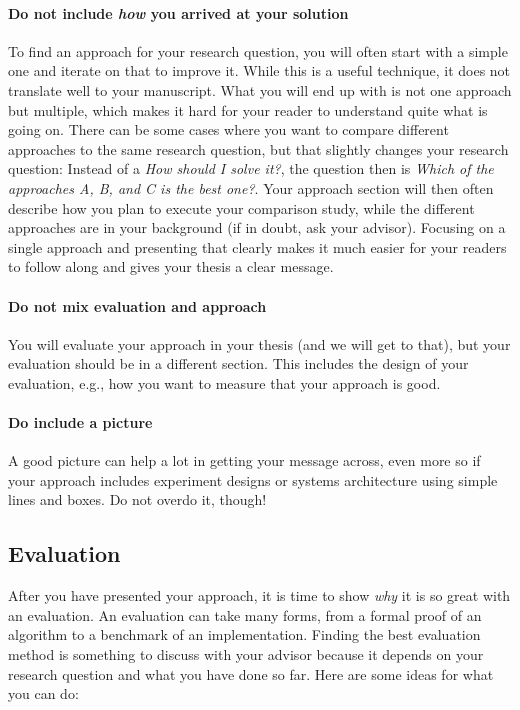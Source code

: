 \documentclass[a4paper]{article}
\begin{document}
\paragraph{Do not include \emph{how} you arrived at your solution}
To find an approach for your research question, you will often start with a simple one and iterate on that to improve it.
While this is a useful technique, it does not translate well to your manuscript.
What you will end up with is not one approach but multiple, which makes it hard for your reader to understand quite what is going on.
There can be some cases where you want to compare different approaches to the same research question, but that slightly changes your research question:
Instead of a \emph{How should I solve it?}, the question then is \emph{Which of the approaches A, B, and C is the best one?}.
Your approach section will then often describe how you plan to execute your comparison study, while the different approaches are in your background (if in doubt, ask your advisor).
Focusing on a single approach and presenting that clearly makes it much easier for your readers to follow along and gives your thesis a clear message.

\paragraph{Do not mix evaluation and approach}
You will evaluate your approach in your thesis (and we will get to that), but your evaluation should be in a different section.
This includes the design of your evaluation, e.g., how you want to measure that your approach is good.

\paragraph{Do include a picture}
A good picture can help a lot in getting your message across, even more so if your approach includes experiment designs or systems architecture using simple lines and boxes.
Do not overdo it, though!

\subsection{Evaluation}

After you have presented your approach, it is time to show \emph{why} it is so great with an evaluation.
An evaluation can take many forms, from a formal proof of an algorithm to a benchmark of an implementation.
Finding the best evaluation method is something to discuss with your advisor because it depends on your research question and what you have done so far.
Here are some ideas for what you can do:
\end{document}
